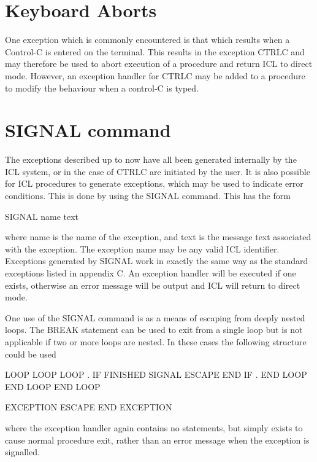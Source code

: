 \documentclass[twoside,11pt,nolof,chapters]{starlink}
\begin{document}
\section{Keyboard Aborts}

One exception which is commonly encountered is that which results when
a Control-C is entered on the terminal. This results in the exception
CTRLC and may therefore be used to abort execution of a procedure and
return ICL to direct mode. However, an exception handler for CTRLC may
be added to a procedure to modify the behaviour when a control-C is
typed.

\section{SIGNAL command}

The exceptions described up to now have all been generated internally by the
ICL system, or in the case of CTRLC are initiated by the user. It is also
possible for ICL procedures to generate exceptions, which may be used to
indicate error conditions. This is done by using the SIGNAL command. This
has the form
\begin{terminalv}
    SIGNAL  name  text
\end{terminalv}
where name is the name of the exception, and text is the message text
associated with the exception. The exception name may be any valid ICL
identifier. Exceptions generated by SIGNAL work in exactly the same way
as the standard exceptions listed in appendix C. An exception handler
will be executed if one exists, otherwise an error message will be output
and ICL will return to direct mode.

One use of the SIGNAL command is as a means of escaping from deeply nested
loops. The BREAK statement can be used to exit from a single loop but is
not applicable if two or more loops are nested. In these cases the following
structure could be used
\begin{terminalv}
    LOOP
      LOOP
        LOOP
          .
          IF FINISHED
            SIGNAL ESCAPE
          END IF
          .
        END LOOP
      END LOOP
    END LOOP

    EXCEPTION ESCAPE
    END EXCEPTION
\end{terminalv}

where the exception handler again contains no statements, but simply exists
to cause normal procedure exit, rather than an error message when the
exception is signalled.
\end{document}
